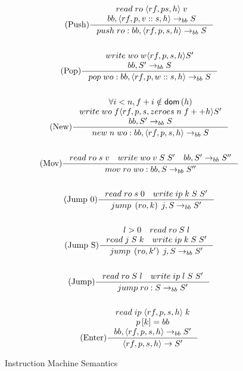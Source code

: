 \begin{figure}
\begin{gather*}
\tag{Push}
\inference{
read \; ro \; \langle rf, p s, h \rangle \; v \\
bb, \langle rf, p, v::s, h \rangle \rightarrow_{bb} S 
}{push \; ro : bb, \langle rf, p, s, h \rangle \rightarrow_{bb} S} \\ \\
\tag{Pop}
\inference{
write \; wo \; w \langle rf, p, s, h \rangle S' \\
bb, S' \rightarrow_{bb} S \\
}{pop \; wo:bb, \langle rf, p, w::s, h \rangle \rightarrow_{bb} S}  \\ \\
\tag{New} \inference{
\forall i < n, f+i \notin \textsf{dom}\left(h\right) \\
write \; wo \; f \langle rf, p, s, zeroes \; n \; f ++ h \rangle S' \\
bb, S' \rightarrow_{bb} S
}{new \; n \; wo:bb, \langle rf, p, s, h \rangle \rightarrow_{bb} S} \\ \\
\tag{Mov} \inference{
read \; ro \; s \; v \quad
write \; wo \; v \; S \; S' \quad
bb, S' \rightarrow_{bb} S''
}{mov \; ro \; wo:bb, S \rightarrow_{bb} S''} \\ \\
\tag{Jump 0} \inference{
read \; ro \; s \; 0 \quad
write \; ip \; k \; S \; S'
}{jump \; \left(ro, k\right) \; j, S \rightarrow_{bb} S'} \\ \\
\tag{Jump S} \inference{
l > 0 \quad 
read \; ro \; S \; l \\
read \; j \; S \; k \quad
write \; ip \; k \; S \; S'
}{jump \; \left(ro, k'\right) \; j, S \rightarrow_{bb} S'} \\ \\
\tag{Jump} \inference{
read \; ro \; S \; l \quad
write \; ip \; l \; S \; S'
}{jump \; ro:S \rightarrow_{bb} S'} \\ \\
\tag{Enter} \inference{
read \; ip \; \langle rf, p, s, h \rangle \; k \\
p\left[k\right] = bb \\
bb, \langle rf, p, s, h \rangle \rightarrow_{bb} S' 
}{\langle rf, p, s, h \rangle \rightarrow S'}
\end{gather*}
\caption{Instruction Machine Semantics}
\label{fig:im_semantics}
\end{figure}

